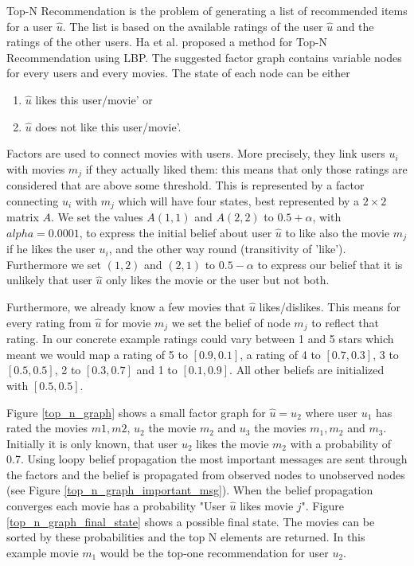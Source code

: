 Top-N Recommendation is the problem of generating a list of recommended items for a user $\hat u$. The list is based on the available ratings of the user $\hat u$ and the ratings of the other users. Ha et al. \cite{Ha:2012:TRT:2396761.2398636} proposed a method for Top-N Recommendation using LBP. The suggested factor graph contains variable nodes for every users and every movies. The state of each node can be either
\begin{enumerate}
   \itemsep0em 
   \item $\hat u$ likes this user/movie' or
   \item $\hat u$ does not like this user/movie'.
\end{enumerate}
Factors are used to connect movies with users. More precisely, they link users $u_i$ with movies $m_j$ if they actually liked them: this means that only those ratings are considered that are above some threshold. This is represented by a factor connecting $u_i$ with $m_j$ which will have four states, best represented by a $2\times 2$ matrix $A$. We set the values $A(1,1)$ and $A(2,2)$ to $0.5 + \alpha$, with $alpha = 0.0001$, to express the initial belief about user $\hat u$ to like also the movie $m_j$ if he likes the user $u_i$, and the other way round (transitivity of 'like'). Furthermore we set $(1,2)$ and $(2,1)$ to $0.5 - \alpha$ to express our belief that it is unlikely that user $\hat u$ only likes the movie or the user but not both.

Furthermore, we already know a few movies that $\hat u$ likes/dislikes. This means for every rating from $\hat u$ for movie $m_j$ we set the belief of node $m_j$ to reflect that rating. In our concrete example ratings could vary between 1 and 5 stars which meant we would map a rating of 5 to $[0.9,0.1]$, a rating of 4 to $[0.7,0.3]$, 3 to $[0.5,0.5]$, 2 to $[0.3,0.7]$ and 1 to $[0.1,0.9]$. All other beliefs are initialized with $[0.5,0.5]$.

Figure \ref{top_n_graph} shows a small factor graph for  $\hat u = u_2$ where user $u_1$ has rated the movies $m1,m2$, $u_2$ the movie $m_2$ and $u_3$ the movies $m_1,m_2$ and $m_3$. Initially it is only known, that user $u_2$ likes the movie $m_2$ with a probability of 0.7. 
Using loopy belief propagation the most important messages are sent through the factors and the belief is propagated from observed nodes to unobserved nodes (see Figure \ref{top_n_graph_important_msg}). When the belief propagation converges each movie has a probability "User $\hat u$ likes movie $j$". Figure \ref{top_n_graph_final_state} shows a possible final state. The movies can be sorted by these probabilities and the top N elements are returned. In this example movie $m_1$ would be the top-one recommendation for user $u_2$.

